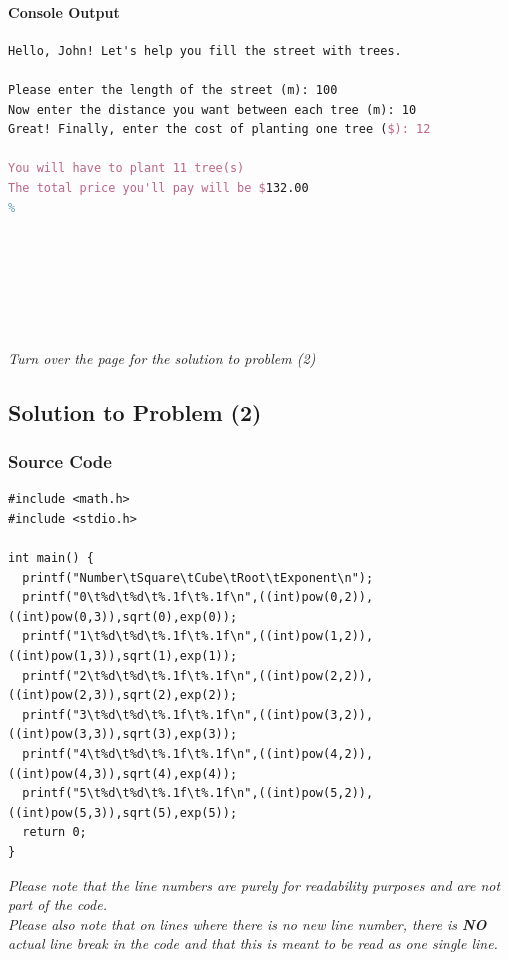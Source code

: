 \documentclass[a4paper,11pt]{article}
\theoremstyle{mytheor}
\begin{document}
\paragraph{Console Output}
\begin{lstlisting}[escapechar=\%,language=tex,numbers=none,label={list:second},title=Program's output to console in plaintext -- using inputs from test sample (1)]
Hello, John! Let's help you fill the street with trees.

Please enter the length of the street (m): 100
Now enter the distance you want between each tree (m): 10
Great! Finally, enter the cost of planting one tree ($): 12

You will have to plant 11 tree(s)
The total price you'll pay will be $132.00
%
\end{lstlisting}
\textit{\\\\\\\\\\\\Turn over the page for the solution to problem (2)}
\newpage
\subsection{Solution to Problem (2)}
\subsubsection{Source Code}
\begin{lstlisting}[label={list:third},title=Program's \texttt{\color{inlinecode}{main.c}} File -- console application to output the full table as described in the problem]
#include <math.h>
#include <stdio.h>

int main() {
  printf("Number\tSquare\tCube\tRoot\tExponent\n");
  printf("0\t%d\t%d\t%.1f\t%.1f\n",((int)pow(0,2)),((int)pow(0,3)),sqrt(0),exp(0));
  printf("1\t%d\t%d\t%.1f\t%.1f\n",((int)pow(1,2)),((int)pow(1,3)),sqrt(1),exp(1));
  printf("2\t%d\t%d\t%.1f\t%.1f\n",((int)pow(2,2)),((int)pow(2,3)),sqrt(2),exp(2));
  printf("3\t%d\t%d\t%.1f\t%.1f\n",((int)pow(3,2)),((int)pow(3,3)),sqrt(3),exp(3));
  printf("4\t%d\t%d\t%.1f\t%.1f\n",((int)pow(4,2)),((int)pow(4,3)),sqrt(4),exp(4));
  printf("5\t%d\t%d\t%.1f\t%.1f\n",((int)pow(5,2)),((int)pow(5,3)),sqrt(5),exp(5));
  return 0;
}
\end{lstlisting}
\textit{Please note that the line numbers are purely for readability purposes and are not part of the code.\\Please also note that on lines where there is no new line number, there is \textbf{NO} actual line break in the code and that this is meant to be read as one single line.}
\end{document}
